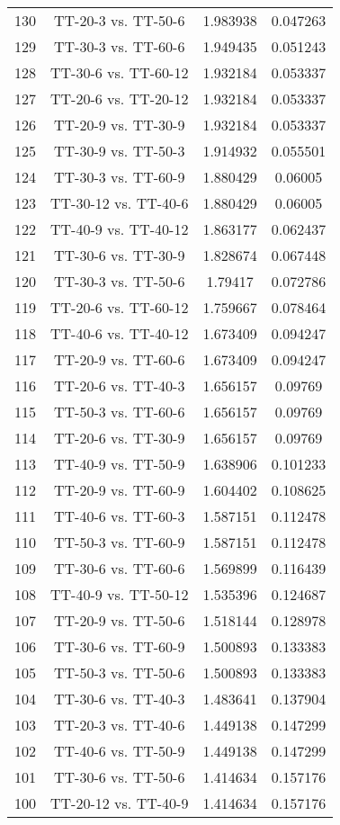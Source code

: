 \documentclass[a4paper,10pt]{article}
\begin{document}
\begin{landscape}
\begin{table}[!htp]
\begin{tabular}{cccc}
130&TT-20-3 vs. TT-50-6&1.983938&0.047263\\
129&TT-30-3 vs. TT-60-6&1.949435&0.051243\\
128&TT-30-6 vs. TT-60-12&1.932184&0.053337\\
127&TT-20-6 vs. TT-20-12&1.932184&0.053337\\
126&TT-20-9 vs. TT-30-9&1.932184&0.053337\\
125&TT-30-9 vs. TT-50-3&1.914932&0.055501\\
124&TT-30-3 vs. TT-60-9&1.880429&0.06005\\
123&TT-30-12 vs. TT-40-6&1.880429&0.06005\\
122&TT-40-9 vs. TT-40-12&1.863177&0.062437\\
121&TT-30-6 vs. TT-30-9&1.828674&0.067448\\
120&TT-30-3 vs. TT-50-6&1.79417&0.072786\\
119&TT-20-6 vs. TT-60-12&1.759667&0.078464\\
118&TT-40-6 vs. TT-40-12&1.673409&0.094247\\
117&TT-20-9 vs. TT-60-6&1.673409&0.094247\\
116&TT-20-6 vs. TT-40-3&1.656157&0.09769\\
115&TT-50-3 vs. TT-60-6&1.656157&0.09769\\
114&TT-20-6 vs. TT-30-9&1.656157&0.09769\\
113&TT-40-9 vs. TT-50-9&1.638906&0.101233\\
112&TT-20-9 vs. TT-60-9&1.604402&0.108625\\
111&TT-40-6 vs. TT-60-3&1.587151&0.112478\\
110&TT-50-3 vs. TT-60-9&1.587151&0.112478\\
109&TT-30-6 vs. TT-60-6&1.569899&0.116439\\
108&TT-40-9 vs. TT-50-12&1.535396&0.124687\\
107&TT-20-9 vs. TT-50-6&1.518144&0.128978\\
106&TT-30-6 vs. TT-60-9&1.500893&0.133383\\
105&TT-50-3 vs. TT-50-6&1.500893&0.133383\\
104&TT-30-6 vs. TT-40-3&1.483641&0.137904\\
103&TT-20-3 vs. TT-40-6&1.449138&0.147299\\
102&TT-40-6 vs. TT-50-9&1.449138&0.147299\\
101&TT-30-6 vs. TT-50-6&1.414634&0.157176\\
100&TT-20-12 vs. TT-40-9&1.414634&0.157176\\

\end{tabular}
\end{table}
\end{landscape}
\end{document}
